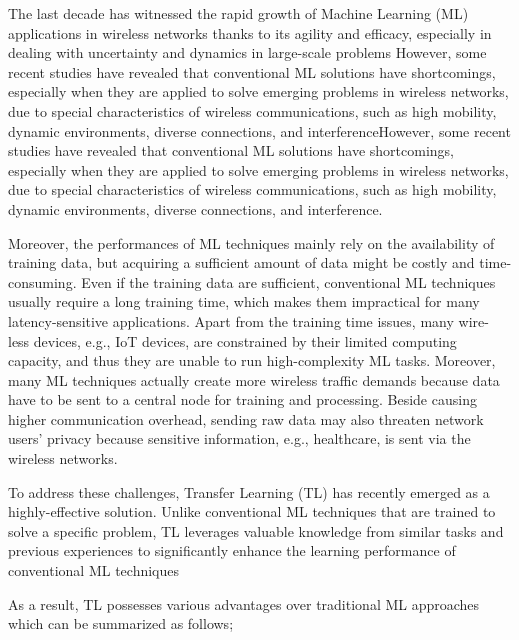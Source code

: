 \documentclass[letterpaper%
, twoside%
, 12pt%
,thesepararticles%
, english%
,creativecommons,hyperref, withAlgo2e%
]{thETS}
\begin{document}
\begin{introduction}

The last decade has witnessed the rapid growth of Machine Learning (ML) applications in wireless networks thanks to its agility and efficacy, especially in dealing with uncertainty and dynamics in large-scale problems
    \cite{8743390} \cite{6336689}
However, some recent studies have revealed that conventional ML solutions have shortcomings, especially when they are applied to solve emerging problems in wireless networks, due to special characteristics of wireless communications, such as high mobility, dynamic environments, diverse connections, and interferenceHowever, some recent studies have revealed that conventional ML solutions have shortcomings, especially when they are applied to solve emerging problems in wireless networks, due to special characteristics of wireless communications, such as high mobility, dynamic environments, diverse connections, and interference.

Moreover, the performances of ML techniques mainly rely on the availability of training data, but acquiring a sufficient amount of data might be costly and time-consuming. Even if the training data are sufficient, conventional ML techniques usually require a long training time, which makes them impractical for many latency-sensitive applications. Apart from the training time issues, many wire- less devices, e.g., IoT devices, are constrained by their limited computing capacity, and thus they are unable to run high-complexity ML tasks. Moreover, many ML techniques actually create more wireless traffic demands because data have to be sent to a central node for training and processing. Beside causing higher communication overhead, sending raw data may also threaten network users' privacy because sensitive information, e.g., healthcare, is sent via the wireless networks.

To address these challenges, Transfer Learning (TL) has recently emerged as a highly-effective solution. Unlike conventional ML techniques that are trained to solve a specific problem, TL leverages valuable knowledge from similar tasks and previous experiences to significantly enhance the learning performance of conventional ML techniques

 As a result, TL possesses various advantages over traditional ML approaches which can be summarized as follows;
 

\end{introduction}
\end{document}
